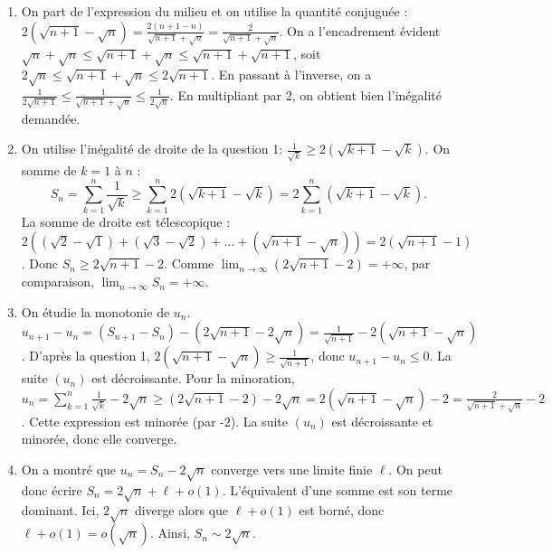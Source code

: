 \documentclass[solutions]{exercices}
\begin{document}
\begin{solution}
	\begin{enumerate}
		\item On part de l'expression du milieu et on utilise la quantité conjuguée :
		      $2(\sqrt{n+1}-\sqrt{n}) = \frac{2(n+1-n)}{\sqrt{n+1}+\sqrt{n}} = \frac{2}{\sqrt{n+1}+\sqrt{n}}$.
		      On a l'encadrement évident $\sqrt{n}+\sqrt{n} \le \sqrt{n+1}+\sqrt{n} \le \sqrt{n+1}+\sqrt{n+1}$, soit $2\sqrt{n} \le \sqrt{n+1}+\sqrt{n} \le 2\sqrt{n+1}$.
		      En passant à l'inverse, on a $\frac{1}{2\sqrt{n+1}} \le \frac{1}{\sqrt{n+1}+\sqrt{n}} \le \frac{1}{2\sqrt{n}}$.
		      En multipliant par 2, on obtient bien l'inégalité demandée.
		\item On utilise l'inégalité de droite de la question 1: $\frac{1}{\sqrt{k}} \ge 2(\sqrt{k+1}-\sqrt{k})$. On somme de $k=1$ à $n$ :
		      \[ S_n = \sum_{k=1}^n \frac{1}{\sqrt{k}} \ge \sum_{k=1}^n 2(\sqrt{k+1}-\sqrt{k}) = 2\sum_{k=1}^n (\sqrt{k+1}-\sqrt{k}). \]
		      La somme de droite est télescopique : $2((\sqrt{2}-\sqrt{1})+(\sqrt{3}-\sqrt{2})+\dots+(\sqrt{n+1}-\sqrt{n})) = 2(\sqrt{n+1}-1)$.
		      Donc $S_n \ge 2\sqrt{n+1}-2$. Comme $\lim_{n\to\infty} (2\sqrt{n+1}-2) = +\infty$, par comparaison, $\lim_{n\to\infty} S_n = +\infty$.
		\item On étudie la monotonie de $u_n$.
		      $u_{n+1}-u_n = (S_{n+1}-S_n) - (2\sqrt{n+1}-2\sqrt{n}) = \frac{1}{\sqrt{n+1}} - 2(\sqrt{n+1}-\sqrt{n})$.
		      D'après la question 1, $2(\sqrt{n+1}-\sqrt{n}) \ge \frac{1}{\sqrt{n+1}}$, donc $u_{n+1}-u_n \le 0$. La suite $(u_n)$ est décroissante.
		      Pour la minoration, $u_n = \sum_{k=1}^n \frac{1}{\sqrt{k}} - 2\sqrt{n} \ge (2\sqrt{n+1}-2) - 2\sqrt{n} = 2(\sqrt{n+1}-\sqrt{n})-2 = \frac{2}{\sqrt{n+1}+\sqrt{n}}-2$.
		      Cette expression est minorée (par -2).
		      La suite $(u_n)$ est décroissante et minorée, donc elle converge.
		\item On a montré que $u_n = S_n - 2\sqrt{n}$ converge vers une limite finie $\ell$. On peut donc écrire $S_n = 2\sqrt{n} + \ell + o(1)$.
		      L'équivalent d'une somme est son terme dominant. Ici, $2\sqrt{n}$ diverge alors que $\ell+o(1)$ est borné, donc $\ell+o(1) = o(\sqrt{n})$.
		      Ainsi, $S_n \sim 2\sqrt{n}$.
	\end{enumerate}
\end{solution}
\end{document}
